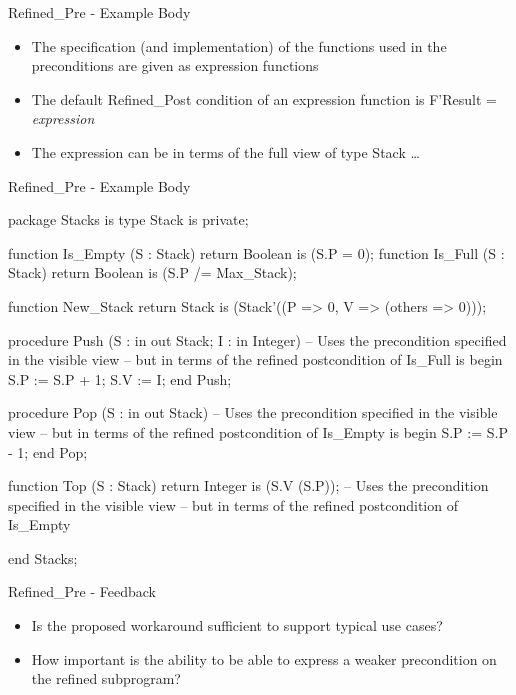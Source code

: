 \documentclass{beamer}
\begin{document}
\begin{frame}[fragile]{Refined\_Pre - Example Body}

  \begin{itemize}

    \item The specification (and implementation) of the functions used
      in the preconditions are given as expression functions
    \item The default Refined\_Post condition of an expression
      function is F'Result = \emph{expression}
   \item The expression can be in terms of the full view of type Stack \ldots
  \end{itemize}

\end{frame}
\begin{frame}[fragile]{Refined\_Pre - Example Body}

  \begin{pxcode}[language=SPARK,style=tinystyle,gobble=4]
    package Stacks
    is
       type Stack is private;
 
       function Is_Empty (S : Stack) return Boolean is (S.P = 0);
       function Is_Full (S : Stack) return Boolean is (S.P /= Max_Stack);

       function New_Stack return Stack is (Stack'((P => 0, V => (others => 0)));

       procedure Push (S : in out Stack; I : in Integer)
       -- Uses the precondition specified in the visible view
       -- but in terms of the refined postcondition of Is\_Full
       is
       begin
          S.P := S.P + 1;
          S.V := I;
       end Push;

       procedure Pop (S : in out Stack)
       -- Uses the precondition specified in the visible view
       -- but in terms of the refined postcondition of Is\_Empty
       is
       begin
            S.P := S.P - 1;
       end Pop;

       function Top (S : Stack) return Integer is (S.V (S.P));
       -- Uses the precondition specified in the visible view
       -- but in terms of the refined postcondition of Is\_Empty

    end Stacks;          
 \end{pxcode}

\end{frame}

\begin{frame}{Refined\_Pre - Feedback}

  \begin{itemize}
  \item Is the proposed workaround sufficient to support typical use cases?
  \item How important is the ability to be able to express a weaker precondition on the refined subprogram?
  \end{itemize}
 
\end{frame}
\end{document}
